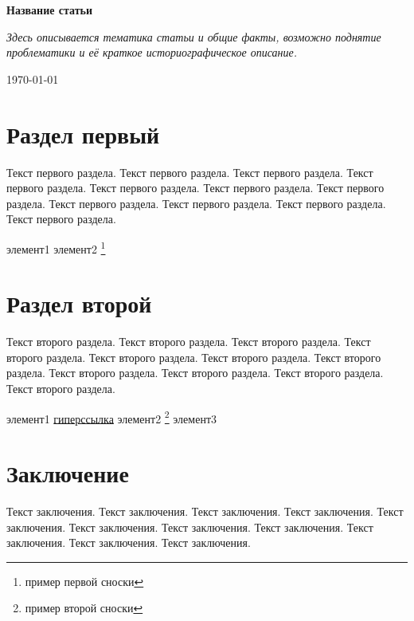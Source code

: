 \documentclass[12pt]{article}			%
\begin{document}
\begin{center}
	\Huge{\textbf{Название статьи}}
\end{center}

\hfill

\noindent
\textit{Здесь описывается тематика статьи и общие факты, возможно поднятие проблематики и её краткое историографическое описание.}

\begin{flushright}
	\today
\end{flushright}
\hfill

	
\section{Раздел первый}
Текст первого раздела. Текст первого раздела. Текст первого раздела. Текст первого раздела. Текст первого раздела. Текст первого раздела. Текст первого раздела. Текст первого раздела. Текст первого раздела. Текст первого раздела. Текст первого раздела. 
\begin{outline}[itemize]
	\1 элемент1
	\1 элемент2 \footnote{пример первой сноски}
\end{outline}

\section{Раздел второй}
Текст второго раздела. Текст второго раздела. Текст второго раздела. Текст второго раздела. Текст второго раздела. Текст второго раздела. Текст второго раздела. Текст второго раздела. Текст второго раздела. Текст второго раздела. Текст второго раздела. 
\begin{outline}[enumerate]
	\1 элемент1 \href{https://www.google.com/}{гиперссылка}
	\1 элемент2 \footnote{пример второй сноски}
	\1 элемент3
\end{outline}

\section{Заключение}
Текст заключения. Текст заключения. Текст заключения. Текст заключения. Текст заключения. Текст заключения. Текст заключения. Текст заключения. Текст заключения. Текст заключения. Текст заключения. 
\end{document}
